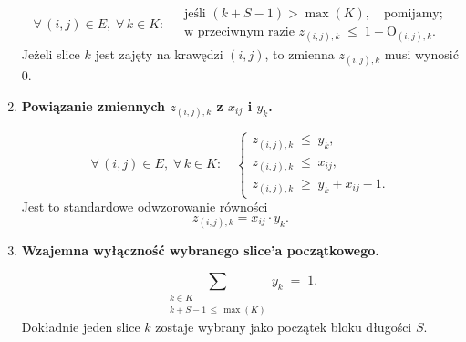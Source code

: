 \documentclass[12pt]{article}
\begin{document}
\begin{enumerate}
	      \[
		      \forall\,(i,j)\in E,\;\forall\,k \in K: \;
		      \begin{aligned}
			       & \text{jeśli }(k + S - 1) > \max(K),\quad \text{pomijamy;}              \\
			       & \text{w przeciwnym razie } z_{(i,j),k} \;\le\; 1 - \text{O}_{(i,j),k}.
		      \end{aligned}
	      \]
	      Jeżeli slice \(k\) jest zajęty na krawędzi \((i,j)\), to zmienna \(z_{(i,j),k}\) musi wynosić 0.

	      \vspace{1em}

	\item \textbf{Powiązanie zmiennych \(z_{(i,j),k}\) z \(x_{ij}\) i \(y_k\).}

	      \[
		      \forall\,(i,j)\in E,\;\forall\,k \in K:\quad
		      \begin{cases}
			      z_{(i,j),k} \;\le\; y_k,    \\
			      z_{(i,j),k} \;\le\; x_{ij}, \\
			      z_{(i,j),k} \;\ge\; y_k + x_{ij} - 1.
		      \end{cases}
	      \]
	      Jest to standardowe odwzorowanie równości
	      \[
		      z_{(i,j),k} = x_{ij} \cdot y_k.
	      \]

	      \vspace{1em}

	\item \textbf{Wzajemna wyłączność wybranego slice'a początkowego.}

	      \[
		      \sum_{\substack{k \in K \\ k + S - 1 \,\le\, \max(K)}}
		      y_k
		      \;=\; 1.
	      \]
	      Dokładnie jeden slice \(k\) zostaje wybrany jako początek bloku długości \(S\).

\end{enumerate}
\end{document}
